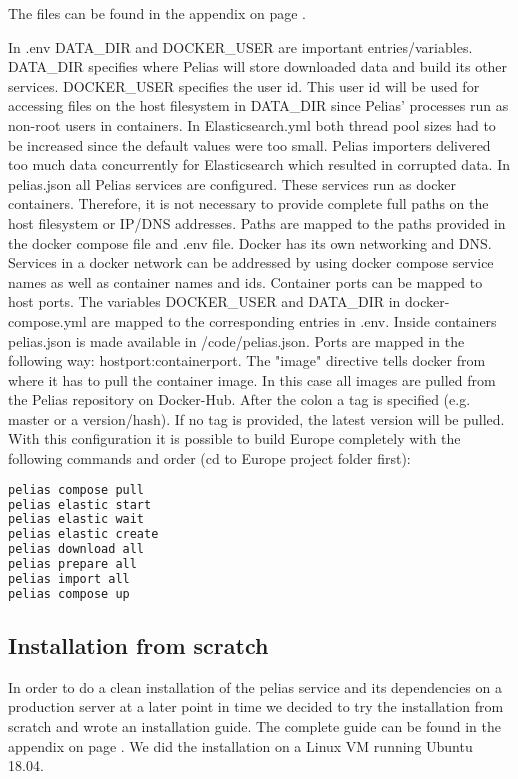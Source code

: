 The files can be found in the appendix on page \pageref{Dicf}.

In .env DATA{\_}DIR and DOCKER{\_}USER are important entries/variables. DATA{\_}DIR specifies where Pelias will store downloaded data and build its other services. DOCKER{\_}USER specifies the user id. This user id will be used for accessing files on the host filesystem in DATA{\_}DIR since Pelias' processes run as non-root users in containers.
In Elasticsearch.yml both thread pool sizes had to be increased since the default values were too small. Pelias importers delivered too much data concurrently for Elasticsearch which resulted in corrupted data.
In pelias.json all Pelias services are configured. These services run as docker containers. Therefore, it is not necessary to provide complete full paths on the host filesystem or IP/DNS addresses. Paths are mapped to the paths provided in the docker compose file  and .env file. Docker has its own networking and DNS. Services in a docker network can be addressed by using docker compose service names as well as container names and ids. Container ports can be mapped to host ports.
The variables DOCKER{\_}USER and DATA{\_}DIR in docker-compose.yml are mapped to the corresponding entries in .env. Inside containers pelias.json is made available in /code/pelias.json. Ports are mapped in the following way:
hostport:containerport.
The "image" directive tells docker from where it has to pull the container image. In this case all images are pulled from the Pelias repository on Docker-Hub. After the colon a tag is specified (e.g. master or a version/hash). If no tag is provided, the latest version will be pulled.
With this configuration it is possible to build Europe completely with the following commands and order (cd to Europe project folder first):
\begin{lstlisting}[language=bash,breaklines=true]
pelias compose pull
pelias elastic start
pelias elastic wait
pelias elastic create
pelias download all
pelias prepare all
pelias import all
pelias compose up
\end{lstlisting}

\subsection{Installation from scratch}
In order to do a clean installation of the pelias service and its dependencies on a production server at a later point in time we decided to try the installation from scratch and wrote an installation guide. The complete guide can be found in the appendix on page \pageref{Pfsig}. We did the installation on a Linux VM running Ubuntu 18.04.

